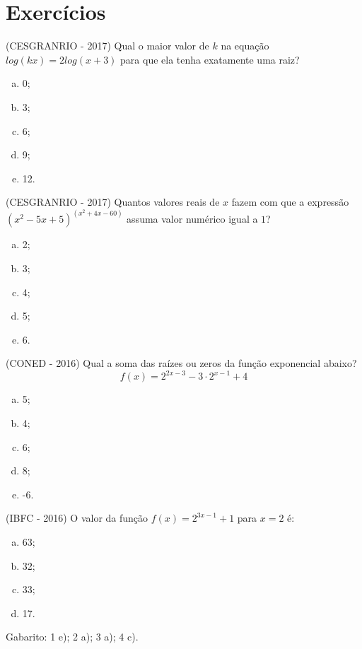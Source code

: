    \section{Exercícios}
  \begin{exer}
  (CESGRANRIO - 2017) Qual o maior valor de $k$ na equação $log(kx) = 2log(x+3)$ para que ela tenha   exatamente uma raiz?
\begin{enumerate}[a)]
\item 0;
\item 3;
\item 6;
\item 9;
\item 12.
\end{enumerate}
  \end{exer}
 
 \begin{exer}
 (CESGRANRIO - 2017) Quantos valores reais de $x$ fazem com que a expressão $(x^2 - 5x + 5)^{(x^2 + 4x - 60)}$ assuma valor numérico igual a $1$?
\begin{enumerate}[a)]
\item 2;
\item 3;
\item 4;
\item 5;
\item 6.
\end{enumerate}
  \end{exer}
  
  \begin{exer}
 (CONED - 2016) Qual a soma das raízes ou zeros da função exponencial abaixo?
\[f(x)= 2^{2x-3} - 3 \cdot 2^{x-1} + 4\]

\begin{enumerate}[a)]
\item 5;
\item 4;
\item 6;
\item 8;
\item -6.
\end{enumerate}
  \end{exer}
  
  \begin{exer}
  (IBFC - 2016) O valor da função $f(x) = 2^{3x-1} + 1$ para $x = 2$ é:
\begin{enumerate}[a)]
\item 63;
\item 32;
\item 33;
\item 17.
\end{enumerate}
  \end{exer}
 
 Gabarito: 1 e); 2 a); 3 a); 4 c).
